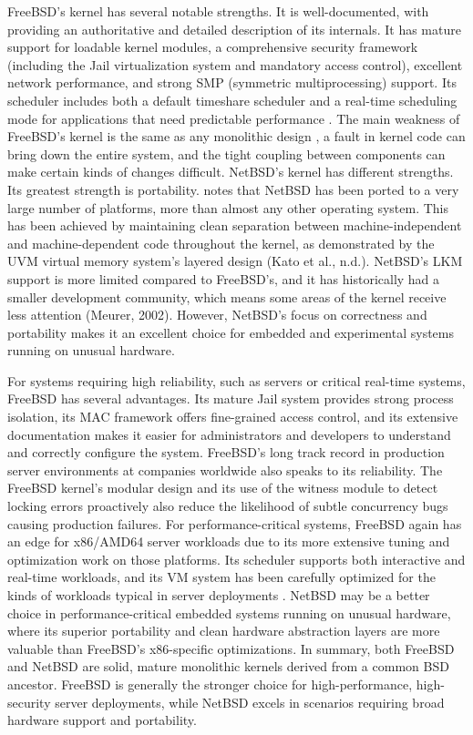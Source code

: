 FreeBSD's kernel has several notable strengths. It is well-documented, with \textcite{watson2015} providing an authoritative and detailed description of its internals. It has mature support for loadable kernel modules, a comprehensive security framework (including the Jail virtualization system and mandatory access control), excellent network performance, and strong SMP (symmetric multiprocessing) support. Its scheduler includes both a default timeshare scheduler and a real-time scheduling mode for applications that need predictable performance \parencite{watson2015}. The main weakness of FreeBSD's kernel is the same as any monolithic design , a fault in kernel code can bring down the entire system, and the tight coupling between components can make certain kinds of changes difficult.
NetBSD's kernel has different strengths. Its greatest strength is portability. \textcite{feyrer2002} notes that NetBSD has been ported to a very large number of platforms, more than almost any other operating system. This has been achieved by maintaining clean separation between machine-independent and machine-dependent code throughout the kernel, as demonstrated by the UVM virtual memory system's layered design (Kato et al., n.d.). NetBSD's LKM support is more limited compared to FreeBSD's, and it has historically had a smaller development community, which means some areas of the kernel receive less attention (Meurer, 2002). However, NetBSD's focus on correctness and portability makes it an excellent choice for embedded and experimental systems running on unusual hardware.

For systems requiring high reliability, such as servers or critical real-time systems, FreeBSD has several advantages. Its mature Jail system provides strong process isolation, its MAC framework offers fine-grained access control, and its extensive documentation \parencite{watson2015} makes it easier for administrators and developers to understand and correctly configure the system. FreeBSD's long track record in production server environments at companies worldwide \parencite{watson2015} also speaks to its reliability. The FreeBSD kernel's modular design and its use of the witness module to detect locking errors proactively also reduce the likelihood of subtle concurrency bugs causing production failures.
For performance-critical systems, FreeBSD again has an edge for x86/AMD64 server workloads due to its more extensive tuning and optimization work on those platforms. Its scheduler supports both interactive and real-time workloads, and its VM system has been carefully optimized for the kinds of workloads typical in server deployments \parencite{watson2015}. NetBSD may be a better choice in performance-critical embedded systems running on unusual hardware, where its superior portability and clean hardware abstraction layers are more valuable than FreeBSD's x86-specific optimizations.
In summary, both FreeBSD and NetBSD are solid, mature monolithic kernels derived from a common BSD ancestor. FreeBSD is generally the stronger choice for high-performance, high-security server deployments, while NetBSD excels in scenarios requiring broad hardware support and portability.

